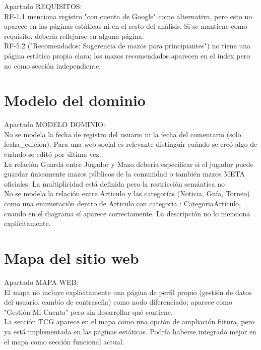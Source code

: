 \documentclass[10pt]{article}
\begin{document}
		Apartado REQUISITOS:\\
		
		RF-1.1 menciona registro "con cuenta de Google" como alternativa, pero esto no aparece en las páginas estáticas ni en el resto del análisis. Si se mantiene como requisito, debería reflejarse en alguna página.\\
		
		RF-5.2 ("Recomendados: Sugerencia de mazos para principiantes") no tiene una página estática propia clara; los mazos recomendados aparecen en el index pero no como sección independiente.\\
	
	\section{Modelo del dominio}
		
		Apartado MODELO DOMINIO:\\
		
		No se modela la fecha de registro del usuario ni la fecha del comentario (solo fecha\_edicion). Para una web social es relevante distinguir cuándo se creó algo de cuándo se editó por última vez.\\
		
		La relación Guarda entre Jugador y Mazo debería especificar si el jugador puede guardar únicamente mazos públicos de la comunidad o también mazos META oficiales. La multiplicidad está definida pero la restricción semántica no\\
		
		No se modela la relación entre Articulo y las categorías (Noticia, Guía, Torneo) como una enumeración dentro de Articulo con categoria : CategoriaArticulo, cuando en el diagrama sí aparece correctamente. La descripción no lo menciona explícitamente.\\
	
	
	\section{Mapa del sitio web}
		Apartado MAPA WEB:\\
		
		El mapa no incluye explícitamente una página de perfil propio (gestión de datos del usuario, cambio de contraseña) como nodo diferenciado; aparece como "Gestión Mi Cuenta" pero sin desarrollar qué contiene.\\
		
		La sección TCG aparece en el mapa como una opción de ampliación futura, pero ya está implementada en las páginas estáticas. Podría haberse integrado mejor en el mapa como sección funcional actual.\\
	
\end{document}
